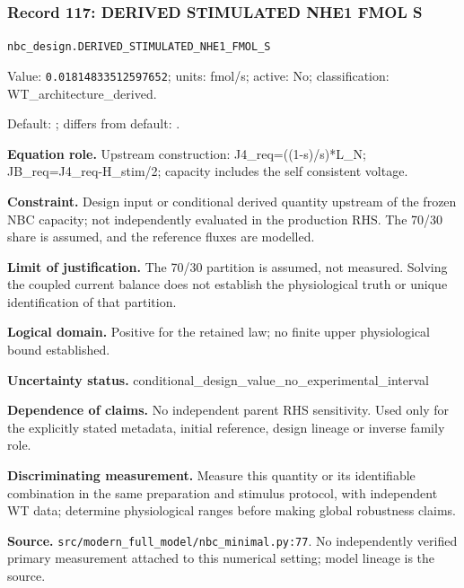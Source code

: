 \subsubsection*{Record 117: DERIVED STIMULATED NHE1 FMOL S}
{\small \nolinkurl{nbc_design.DERIVED_STIMULATED_NHE1_FMOL_S}\par

Value: \texttt{0.01814833512597652}; units: fmol/s; active: No; classification: WT\_architecture\_derived.\par

Default: ; differs from default: .\par

\textbf{Equation role.} Upstream construction: J4\_req=((1-s)/s)*L\_N; JB\_req=J4\_req-H\_stim/2; capacity includes the self consistent voltage.\par

\textbf{Constraint.} Design input or conditional derived quantity upstream of the frozen NBC capacity; not independently evaluated in the production RHS. The 70/30 share is assumed, and the reference fluxes are modelled.\par

\textbf{Limit of justification.} The 70/30 partition is assumed, not measured. Solving the coupled current balance does not establish the physiological truth or unique identification of that partition.\par

\textbf{Logical domain.} Positive for the retained law; no finite upper physiological bound established.\par

\textbf{Uncertainty status.} conditional\_design\_value\_no\_experimental\_interval\par

\textbf{Dependence of claims.} No independent parent RHS sensitivity. Used only for the explicitly stated metadata, initial reference, design lineage or inverse family role.\par

\textbf{Discriminating measurement.} Measure this quantity or its identifiable combination in the same preparation and stimulus protocol, with independent WT data; determine physiological ranges before making global robustness claims.\par

\textbf{Source.} \nolinkurl{src/modern_full_model/nbc_minimal.py:77}. No independently verified primary measurement attached to this numerical setting; model lineage is the source.\par}

